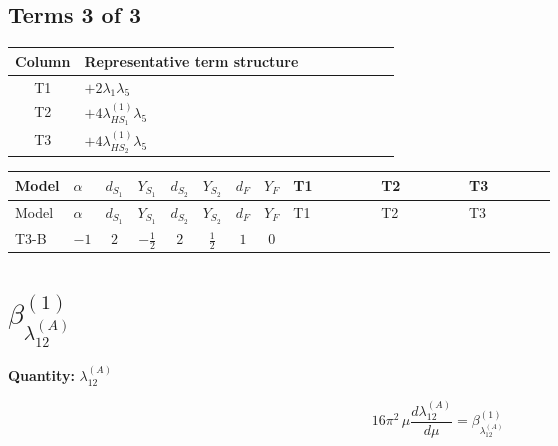 \documentclass[8pt]{article}
\begin{document}
\begin{landscape}
\subsection*{Terms 3 of 3}
\begin{center}
\begin{tabular}{@{}c >{\raggedright\arraybackslash}p{0.82\linewidth}@{}}
\toprule
Column & Representative term structure \\
\midrule
T1 & \(\displaystyle +2 {\lambda_1} {\lambda_5}\) \\
\midrule
T2 & \(\displaystyle +4 {\lambda_{HS_1}^{(1)}} {\lambda_5}\) \\
\midrule
T3 & \(\displaystyle +4 {\lambda_{HS_2}^{(1)}} {\lambda_5}\) \\
\midrule
\bottomrule
\end{tabular}
\end{center}
\smallskip
\tiny
\begin{longtable}{@{}llcccccc >{\raggedright\arraybackslash}p{0.21\linewidth} >{\raggedright\arraybackslash}p{0.21\linewidth} >{\raggedright\arraybackslash}p{0.21\linewidth}@{}}
\toprule
Model & $\alpha$ & $d_{S_1}$ & $Y_{S_1}$ & $d_{S_2}$ & $Y_{S_2}$ & $d_F$ & $Y_F$ & T1 & T2 & T3 \\
\midrule
\endfirsthead
\toprule
Model & $\alpha$ & $d_{S_1}$ & $Y_{S_1}$ & $d_{S_2}$ & $Y_{S_2}$ & $d_F$ & $Y_F$ & T1 & T2 & T3 \\
\midrule
\endhead
T3-B & $-1$ & $2$ & $-\frac{1}{2}$ & $2$ & $\frac{1}{2}$ & $1$ & $0$ & \scriptsize\adjustbox{max width=\linewidth}{$\begin{gathered} +2 {\lambda_1} {\lambda_5}\end{gathered}$} & \scriptsize\adjustbox{max width=\linewidth}{$\begin{gathered} +4 {\lambda_{HS_1}^{(1)}} {\lambda_5}\end{gathered}$} & \scriptsize\adjustbox{max width=\linewidth}{$\begin{gathered} +4 {\lambda_{HS_2}^{(1)}} {\lambda_5}\end{gathered}$} \\
\midrule
\bottomrule
\end{longtable}
\clearpage
\section*{$\beta_{\lambda_{12}^{(A)}}^{(1)}$}
\noindent\textbf{Quantity: }$\lambda_{12}^{(A)}$\par\smallskip
\[16\pi^2\,\mu\frac{d \lambda_{12}^{(A)}}{d\mu}=\beta_{\lambda_{12}^{(A)}}^{(1)}\]

\end{landscape}
\end{document}
